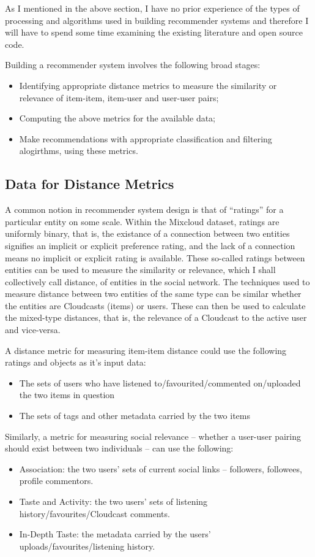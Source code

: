 As I mentioned in the above section, I have no prior experience of the types of processing and algorithms used in building recommender systems and therefore I will have to spend some time examining the existing literature and open source code.

Building a recommender system involves the following broad stages: 
\begin{itemize}
 \item Identifying appropriate distance metrics to measure the similarity or relevance of item-item, item-user and user-user pairs;
 \item Computing the above metrics for the available data;
 \item Make recommendations with appropriate classification and filtering alogirthms, using these metrics.
\end{itemize}

\subsection*{Data for Distance Metrics}


A common notion in recommender system design is that of ``ratings'' for a particular entity on some scale. Within the Mixcloud dataset, ratings are uniformly binary, that is, the existance of a connection between two entities signifies an implicit or explicit preference rating, and the lack of a connection means no implicit or explicit rating is available. These so-called ratings between entities can be used to measure the similarity or relevance, which I shall collectively call distance, of entities in the social network. The techniques used to measure distance between two entities of the same type can be similar whether the entities are Cloudcasts (items) or users. These can then be used to calculate the mixed-type distances, that is, the relevance of a Cloudcast to the active user and vice-versa.

A distance metric for measuring item-item distance could use the following ratings and objects as it's input data: 
\begin{itemize}
 \item The sets of users who have listened to/favourited/commented on/uploaded the two items in question
 \item The sets of tags and other metadata carried by the two items 
\end{itemize}


Similarly, a metric for measuring social relevance -- whether a user-user pairing should exist between two individuals -- can use the following:
\begin{itemize}
 \item Association: the two users' sets of current social links -- followers, followees, profile commentors. 
 \item Taste and Activity: the two users' sets of listening history/favourites/Cloudcast comments.
 \item In-Depth Taste: the metadata carried by the users' uploads/favourites/listening history.
\end{itemize}

